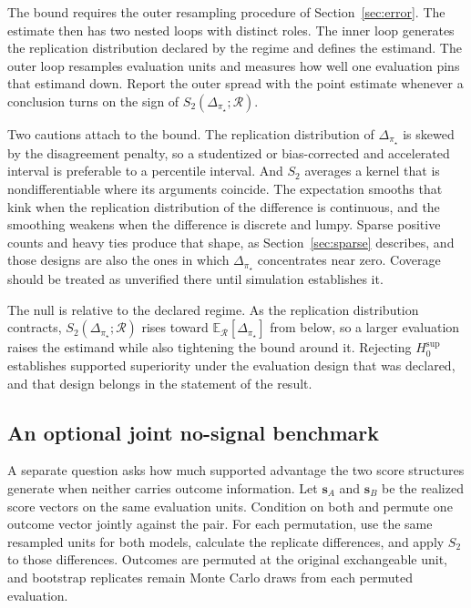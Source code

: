 \documentclass[11pt]{article}
\newcommand{\Regime}{\mathcal{R}}
\newcommand{\E}{\mathbb{E}}
\theoremstyle{remark}
\begin{document}
The bound requires the outer resampling procedure of Section~\ref{sec:error}. The estimate then has two nested loops with distinct roles. The inner loop generates the replication distribution declared by the regime and defines the estimand. The outer loop resamples evaluation units and measures how well one evaluation pins that estimand down. Report the outer spread with the point estimate whenever a conclusion turns on the sign of $S_2(\Delta_{\pi_\star};\Regime)$.

Two cautions attach to the bound. The replication distribution of $\Delta_{\pi_\star}$ is skewed by the disagreement penalty, so a studentized or bias-corrected and accelerated interval is preferable to a percentile interval. And $S_2$ averages a kernel that is nondifferentiable where its arguments coincide. The expectation smooths that kink when the replication distribution of the difference is continuous, and the smoothing weakens when the difference is discrete and lumpy. Sparse positive counts and heavy ties produce that shape, as Section~\ref{sec:sparse} describes, and those designs are also the ones in which $\Delta_{\pi_\star}$ concentrates near zero. Coverage should be treated as unverified there until simulation establishes it.

The null is relative to the declared regime. As the replication distribution contracts, $S_2(\Delta_{\pi_\star};\Regime)$ rises toward $\E_{\Regime}[\Delta_{\pi_\star}]$ from below, so a larger evaluation raises the estimand while also tightening the bound around it. Rejecting $H_0^{\mathrm{sup}}$ establishes supported superiority under the evaluation design that was declared, and that design belongs in the statement of the result.

\subsection{An optional joint no-signal benchmark}
\label{sec:joint-null}

A separate question asks how much supported advantage the two score structures generate when neither carries outcome information. Let $\mathbf{s}_A$ and $\mathbf{s}_B$ be the realized score vectors on the same evaluation units. Condition on both and permute one outcome vector jointly against the pair. For each permutation, use the same resampled units for both models, calculate the replicate differences, and apply $S_2$ to those differences. Outcomes are permuted at the original exchangeable unit, and bootstrap replicates remain Monte Carlo draws from each permuted evaluation.
\end{document}
